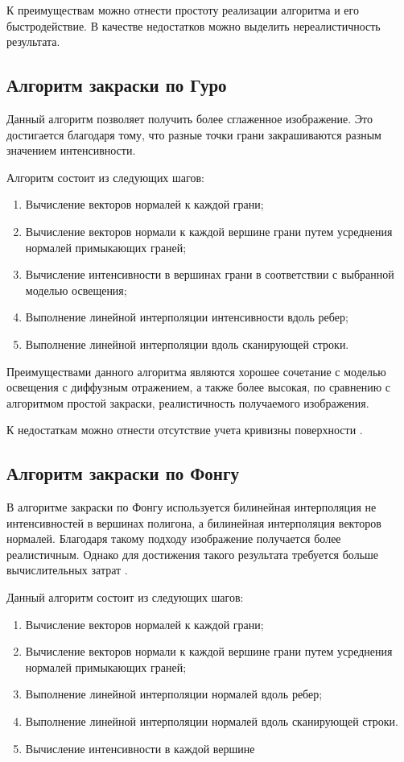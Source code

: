 К преимуществам можно отнести простоту реализации алгоритма и его быстродействие. В качестве недостатков можно выделить нереалистичность результата.

\subsection{Алгоритм закраски по Гуро}

Данный алгоритм позволяет получить более сглаженное изображение. Это
достигается благодаря тому, что разные точки грани закрашиваются разным
значением интенсивности.

Алгоритм состоит из следующих шагов:

\begin{enumerate}[label={\arabic*)}]
	\item Вычисление векторов нормалей к каждой грани;
	\item Вычисление векторов нормали к каждой вершине грани путем усреднения нормалей примыкающих граней;
	\item Вычисление интенсивности в вершинах грани в соответствии с выбранной моделью освещения;
	\item Выполнение линейной интерполяции интенсивности вдоль ребер;
	\item Выполнение линейной интерполяции вдоль сканирующей строки.
\end{enumerate}

Преимуществами данного алгоритма являются хорошее сочетание с моделью освещения с диффузным отражением, а также более высокая, по сравнению с алгоритмом простой закраски, реалистичность получаемого изображения.

К недостаткам можно отнести отсутствие учета кривизны поверхности \cite{rodjers}.

\subsection{Алгоритм закраски по Фонгу}

В алгоритме закраски по Фонгу используется билинейная интерполяция не интенсивностей в вершинах полигона, а билинейная интерполяция векторов нормалей. Благодаря такому подходу изображение получается более реалистичным. Однако для достижения такого результата требуется больше вычислительных затрат \cite{rodjers}.

Данный алгоритм состоит из следующих шагов:

\begin{enumerate}[label={\arabic*)}]
	\item Вычисление векторов нормалей к каждой грани;
	\item Вычисление векторов нормали к каждой вершине грани путем усреднения нормалей примыкающих граней;
	\item Выполнение линейной интерполяции нормалей вдоль ребер;
	\item Выполнение линейной интерполяции нормалей вдоль сканирующей строки.
	\item Вычисление интенсивности в каждой вершине
\end{enumerate}



